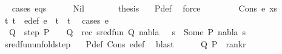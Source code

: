 \begin{isabellebody}
\ \ \isamarkupfalse%
{\isacharparenleft}{\kern0pt}cases\ eqs{\isacharparenright}{\kern0pt}\isanewline
\ \ \ \ \isamarkupfalse%
\ Nil\isanewline
\ \ \ \ \isamarkupfalse%
\ \isamarkupfalse%
\ {\isacharquery}{\kern0pt}thesis\ \isamarkupfalse%
\ {}{\isacharparenleft}{\kern0pt}{}{\isacharparenright}{\kern0pt}\ P{\isacharunderscore}{\kern0pt}def\ \isamarkupfalse%
\ force\isanewline
\ \ \isamarkupfalse%
\isanewline
\ \ \ \ \isamarkupfalse%
\ {\isacharparenleft}{\kern0pt}Cons\ e\ xs{\isacharparenright}{\kern0pt}\isanewline
\ \ \ \ \isamarkupfalse%
\ t{}\ t{}\ \ e{\isacharunderscore}{\kern0pt}def{\isacharcolon}{\kern0pt}\ {\isachardoublequoteopen}e\ {\isacharequal}{\kern0pt}\ {\isacharparenleft}{\kern0pt}t{}\ {\isasymapprox}{\isacharquery}{\kern0pt}\ t{}{\isacharparenright}{\kern0pt}{\isachardoublequoteclose}\ \isamarkupfalse%
\ {\isacharparenleft}{\kern0pt}cases\ e{\isacharparenright}{\kern0pt}\isanewline
\ \ \ \ \isamarkupfalse%
\ {\isasymsigma}\ Q\ \ step{\isacharcolon}{\kern0pt}\ {\isachardoublequoteopen}P\ {\isasymturnstile}\ {\isasymsigma}\ {\isasymleadsto}\ Q{\isachardoublequoteclose}\ \ rec{\isacharcolon}{\kern0pt}\ {\isachardoublequoteopen}sred{\isacharunderscore}{\kern0pt}fun\ {\isacharparenleft}{\kern0pt}Q{\isacharcomma}{\kern0pt}\ nabla{\isacharcomma}{\kern0pt}\ {\isasymsigma}\ {\isasymbullet}\ s{\isacharparenright}{\kern0pt}\ {\isacharequal}{\kern0pt}\ Some\ {\isacharparenleft}{\kern0pt}P{\isacharprime}{\kern0pt}{\isacharcomma}{\kern0pt}\ nabla{\isacharprime}{\kern0pt}{\isacharcomma}{\kern0pt}\ s{\isacharprime}{\kern0pt}{\isacharparenright}{\kern0pt}{\isachardoublequoteclose}\isanewline
\ \ \ \ \ \ \isamarkupfalse%
\ sred{\isacharunderscore}{\kern0pt}fun{\isacharunderscore}{\kern0pt}unfold{\isacharunderscore}{\kern0pt}step\ {}{\isacharparenleft}{\kern0pt}{}{\isacharparenright}{\kern0pt}\ \isamarkupfalse%
\ P{\isacharunderscore}{\kern0pt}def\ Cons\ e{\isacharunderscore}{\kern0pt}def\ \isamarkupfalse%
\ blast\isanewline
\ \ \ \ \isamarkupfalse%
\ {\isachardoublequoteopen}{\isacharparenleft}{\kern0pt}Q{\isacharcomma}{\kern0pt}\ P{\isacharparenright}{\kern0pt}\ {\isasymin}\ rank{\isacharunderscore}{\kern0pt}r{\isachardoublequoteclose}\isanewline

\end{isabellebody}
